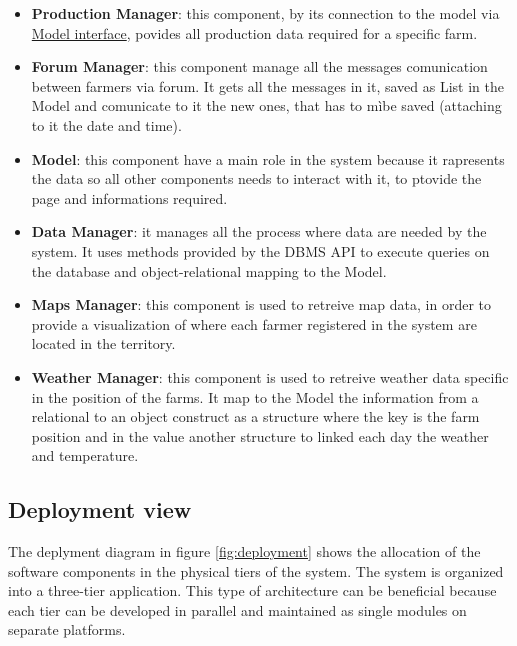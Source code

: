 \begin{itemize}
    \item \textbf{Production Manager}: this component, by its connection to the model via \underline{Model interface}, povides all production data required for a specific farm. 
    \item \textbf{Forum Manager}: this component manage all the messages comunication between farmers via forum. It gets all the messages in it, saved as  List in the Model and comunicate to it the new ones, that has to mìbe saved (attaching to it the date and time).
    \item \textbf{Model}: this component have a main role in the system because it rapresents the data so all other components needs to interact with it, to ptovide the page and informations required.
    \item \textbf{Data Manager}: it manages all the process where data are needed by the system. It uses methods provided by the DBMS API to execute queries on the database and object-relational mapping to the Model.
    \item \textbf{Maps Manager}: this component is used to retreive map data, in order to provide a visualization of where each farmer registered in the system are located in the territory.
    \item \textbf{Weather Manager}: this component is used to retreive weather data specific in the position of the farms. It map to the Model the information from a relational to an object construct as a structure where the key is the farm position and in the value another structure to linked each day the weather and temperature.
\end{itemize}

\subsection{Deployment view}
The deplyment diagram in figure \ref{fig:deployment} shows the allocation of the software components in the physical tiers of the system. 
The system is organized into a three-tier application. This type of architecture can be 
beneficial because each tier can be developed in parallel and maintained as single modules on separate platforms.


